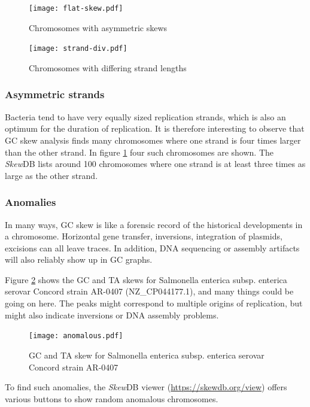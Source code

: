 \documentclass[fleqn,10pt]{wlscirep}
\begin{document}
\begin{figure}[ht]
  \centering
  \begin{minipage}[b]{0.45\linewidth}
    \texttt{[image: flat-skew.pdf]}
    \caption{Chromosomes with asymmetric skews}
    \label{fig:asym-skew}
  \end{minipage}
  \quad
  \begin{minipage}[b]{0.45\linewidth}
    \texttt{[image: strand-div.pdf]}
    \caption{Chromosomes with differing strand lengths}
    \label{fig:strand-div}
  \end{minipage}
\end{figure}

\subsubsection*{Asymmetric strands}
Bacteria tend to have very equally sized replication strands, which is also an optimum for the duration of replication. It is therefore interesting to observe that GC skew analysis finds many chromosomes where one strand is four times larger than the other strand.  In  figure \ref{fig:strand-div} four such chromosomes are shown. The \emph{Skew}DB lists around 100 chromosomes where one strand is at least three times as large as the other strand.


\subsubsection*{Anomalies}
In many ways, GC skew is like a forensic record of the historical developments in a chromosome. Horizontal gene transfer, inversions, integration of plasmids, excisions can all leave traces. In addition, DNA sequencing or assembly artifacts will also reliably show up in GC graphs.

Figure \ref{fig:anomalous} shows the GC and TA skews for Salmonella enterica subsp. enterica serovar Concord strain AR-0407 (NZ\_CP044177.1), and many things could be going on here. The peaks might correspond to multiple origins of replication, but might also indicate inversions or DNA assembly problems.

\begin{figure}[ht]
\centering
\texttt{[image: anomalous.pdf]}
\caption{GC and TA skew for Salmonella enterica subsp. enterica serovar Concord strain AR-0407}
\label{fig:anomalous}
\end{figure}


To find such anomalies, the \emph{Skew}DB viewer (\url{https://skewdb.org/view}) offers various buttons to show random anomalous chromosomes. 
\end{document}
